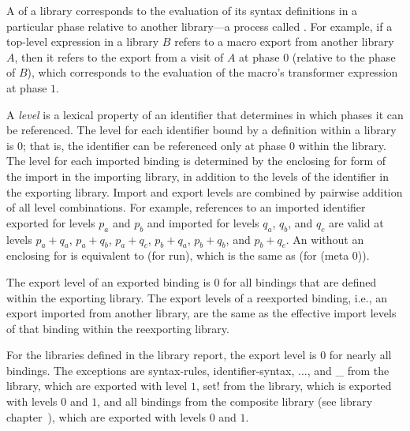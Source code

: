 A  of a library corresponds to the evaluation of its syntax
definitions in a particular phase relative to another
library---a process called . 
For example, if a top-level expression in a library $B$ refers to
a macro export from another library $A$, then it refers to the export from a
visit of $A$ at phase $0$ (relative to the phase of $B$), which corresponds
to the evaluation of the macro's transformer expression at phase $1$.


%
A \emph{level} is a lexical property of an identifier that determines
in which phases it can be referenced. The level for each identifier
bound by a definition within a library is $0$; that is, the identifier
can be referenced only at phase $0$ within the library.
The level for each imported binding is determined by the enclosing {\cf
  for} form of the {\cf import} in the importing library, in
addition to the levels of the identifier in the exporting
library. Import and export levels are combined by pairwise addition of
all level combinations.  For example, references to an imported
identifier exported for levels $p_a$ and $p_b$ and imported for levels
$q_a$, $q_b$, and $q_c$ are valid at levels $p_a+q_a$, $p_a+q_b$,
$p_a+q_c$, $p_b+q_a$, $p_b+q_b$, and $p_b+q_c$. An 
without an enclosing {\cf for} is equivalent to {\cf (for
   run)}, which is the same as {\cf (for
   (meta 0))}.

The export level of an exported binding is $0$ for all bindings
that are defined within the exporting library. The export levels of a
reexported binding, i.e., an export imported from another library, are the
same as the effective import levels of that binding within the reexporting
library.

For the libraries defined in the library report, the export level is
$0$ for nearly all bindings. The exceptions are {\cf syntax-rules},
{\cf identifier-syntax}, {\cf ...}, and {\cf \_} from the
 library, which are exported with level $1$, {\cf
  set!} from the  library, which is exported with
levels $0$ and $1$, and all bindings from the composite
\thersixlibrary{} library (see library
chapter~), which are
exported with levels $0$ and $1$.

